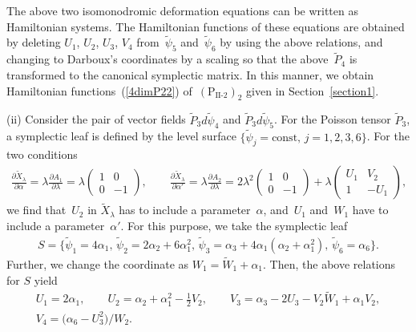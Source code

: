\documentclass[pdftex]{sigma}
\numberwithin{equation}{section}
\begin{document}
The above two isomonodromic deformation equations can be written as Hamiltonian systems. The Hamiltonian functions of these equations are obtained by deleting $U_1$, $U_2$, $U_3$, $V_4$ from~$\widetilde{\psi}_5$ and~$\widetilde{\psi}_6$ by using the above relations, and changing to Darboux's coordinates by a scaling so that the above~$\widetilde{P}_4$ is transformed to the canonical symplectic matrix. In this manner, we obtain Hamiltonian functions~(\ref{4dimP22}) of~$(\text{P}_\text{II-2})_2$ given in Section~\ref{section1}.

(ii) Consider the pair of vector f\/ields $\widetilde{P}_3 d\widetilde{\psi}_4$ and $\widetilde{P}_3 d\widetilde{\psi}_5$. For the Poisson tensor $\widetilde{P}_3$, a symplectic leaf is def\/ined by the level surface $\{ \widetilde{\psi}_j = \text{const},\, j=1,2,3,6\}$. For the two conditions
\begin{gather}
\frac{\partial \widetilde{X}_\lambda }{\partial \alpha } = \lambda \frac{\partial A_1 }{\partial \lambda } = \lambda \left(
\begin{matrix}
1 & 0 \\
0 & -1
\end{matrix}
\right), \qquad
\frac{\partial \widetilde{X}_\lambda }{\partial \alpha' } = \lambda \frac{\partial A_2 }{\partial \lambda } = 2\lambda^2 \left(
\begin{matrix}
1 & 0 \\
0 & -1
\end{matrix}
\right) + \lambda \left(
\begin{matrix}
U_1 & V_2 \\
1 & -U_1
\end{matrix}
\right), \label{4-2}
\end{gather}
we f\/ind that~$U_2$ in $\widetilde{X}_\lambda $ has to include a parameter~$\alpha $, and~$U_1$ and~$W_1$ have to include a parame\-ter~$\alpha' $. For this purpose, we take the symplectic leaf
\begin{gather*}
S = \big\{ \widetilde{\psi}_1 = 4\alpha _1,\, \widetilde{\psi}_2 = 2\alpha _2+6\alpha _1^2 ,\, \widetilde{\psi}_3 = \alpha _3+4\alpha _1(\alpha _2+\alpha _1^2),\, \widetilde{\psi}_6 = \alpha _6 \big\}.
\end{gather*}
Further, we change the coordinate as $W_1 = \widetilde{W}_1 + \alpha _1$. Then, the above relations for $S$ yield
\begin{gather*}
 U_1 = 2\alpha _1,\qquad U_2 = \alpha _2+\alpha _1^2-\frac{1}{2}V_2,\qquad V_3 = \alpha _3- 2U_3-V_2\widetilde{W}_1 + \alpha _1V_2, \\
 V_4 = \big(\alpha _6-U_3^2\big)/W_2.
\end{gather*}
\end{document}
